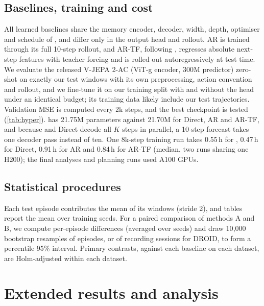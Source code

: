 \subsection{Baselines, training and cost}\label{app:baselines}\label{app:training}
All learned baselines share the memory encoder, decoder, width, depth, optimiser and schedule of \ours{}, and differ
only in the output head and rollout.
%
AR is trained through its full 10-step rollout, and AR-TF, following \citet{zhou2025dinowm}, regresses absolute
next-step features with teacher forcing and is rolled out autoregressively at test time.
%
We evaluate the released V-JEPA 2-AC (ViT-g encoder, 300M predictor) zero-shot on exactly our test windows with its own
preprocessing, action convention and rollout, and we fine-tune it on our training split with and without the head under
an identical budget; its training data likely include our test trajectories.
%
Validation MSE is computed every 2k steps, and the best checkpoint is tested (\cref{tab:hyper}).
%
\ours{} has 21.75M parameters against 21.70M for Direct, AR and AR-TF, and because \ours{} and Direct decode all $K$
steps in parallel, a 10-step forecast takes one decoder pass instead of ten.
%
One 8k-step training run takes 0.55\,h for \ours{}, 0.47\,h for Direct, 0.91\,h for AR and 0.84\,h for AR-TF (median,
two runs sharing one H200); the final analyses and planning runs used A100 GPUs.


\subsection{Statistical procedures}\label{app:stats}
Each test episode contributes the mean of its windows (stride 2), and tables report the mean over training seeds.
%
For a paired comparison of methods A and B, we compute per-episode differences (averaged over seeds) and draw 10{,}000
bootstrap resamples of episodes, or of recording sessions for DROID, to form a percentile 95\% interval.
%
Primary contrasts, \ours{} against each baseline on each dataset, are Holm-adjusted within each dataset.

\FloatBarrier
\section{Extended results and analysis}\label{app:results}\label{app:analysis-all}
